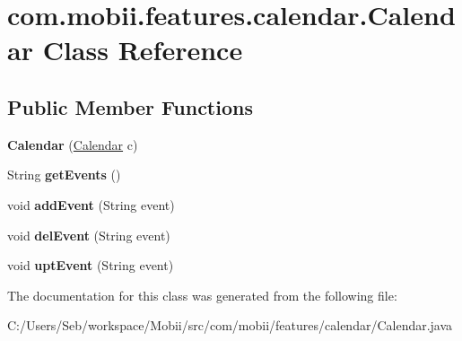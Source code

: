 \hypertarget{classcom_1_1mobii_1_1features_1_1calendar_1_1_calendar}{\section{com.\-mobii.\-features.\-calendar.\-Calendar Class Reference}
\label{classcom_1_1mobii_1_1features_1_1calendar_1_1_calendar}
}
\subsection*{Public Member Functions}
\begin{DoxyCompactItemize}
\item 
\hypertarget{classcom_1_1mobii_1_1features_1_1calendar_1_1_calendar_aeaa2256814f34fff40da5aa3ec5874d0}{{\bfseries Calendar} (\hyperlink{classcom_1_1mobii_1_1features_1_1calendar_1_1_calendar}{Calendar} c)}\label{classcom_1_1mobii_1_1features_1_1calendar_1_1_calendar_aeaa2256814f34fff40da5aa3ec5874d0}

\item 
\hypertarget{classcom_1_1mobii_1_1features_1_1calendar_1_1_calendar_a033a8c0efd935bd79612f410eea68784}{String {\bfseries get\-Events} ()}\label{classcom_1_1mobii_1_1features_1_1calendar_1_1_calendar_a033a8c0efd935bd79612f410eea68784}

\item 
\hypertarget{classcom_1_1mobii_1_1features_1_1calendar_1_1_calendar_a91f53ee69245c5dcbb346fed89eddd49}{void {\bfseries add\-Event} (String event)}\label{classcom_1_1mobii_1_1features_1_1calendar_1_1_calendar_a91f53ee69245c5dcbb346fed89eddd49}

\item 
\hypertarget{classcom_1_1mobii_1_1features_1_1calendar_1_1_calendar_add0e1a36ed0dd77017fb2e0e6584056b}{void {\bfseries del\-Event} (String event)}\label{classcom_1_1mobii_1_1features_1_1calendar_1_1_calendar_add0e1a36ed0dd77017fb2e0e6584056b}

\item 
\hypertarget{classcom_1_1mobii_1_1features_1_1calendar_1_1_calendar_accb0c6f9e3c3eca7d6355464c4f68b3c}{void {\bfseries upt\-Event} (String event)}\label{classcom_1_1mobii_1_1features_1_1calendar_1_1_calendar_accb0c6f9e3c3eca7d6355464c4f68b3c}

\end{DoxyCompactItemize}


The documentation for this class was generated from the following file\-:\begin{DoxyCompactItemize}
\item 
C\-:/\-Users/\-Seb/workspace/\-Mobii/src/com/mobii/features/calendar/Calendar.\-java\end{DoxyCompactItemize}
